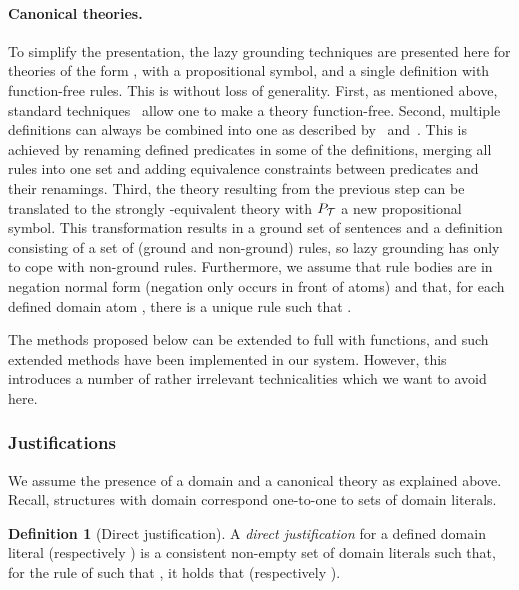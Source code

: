 \documentclass[11pt]{article}
\newcommand{\m}[1]{\ensuremath{#1}\xspace}
\newcommand{\theory}{\m{\mathcal{T}}}
\newcommand{\logicname}[1]{\text{\sc #1}\xspace}
\newcommand{\foid}{\logicname{FO(\ensuremath{ID})}}
\theoremstyle{plain}
\theoremstyle{definition}
\newtheorem{definition}[thm]{Definition}
\theoremstyle{example_basic}
\theoremstyle{example_contd}
\theoremstyle{plain}
\newcommand{\pt}{\ensuremath{P_\text{\theory}}\xspace}
\newcommand{\change}[1]{#1}
\begin{document}
\paragraph{Canonical theories.} To simplify the presentation, the lazy
grounding techniques are presented here for theories of the form
, with  a propositional symbol, and  a single
definition with function-free rules. This is without loss of
generality. First, as mentioned above, standard
techniques~\cite{Enderton01} allow one to make a theory function-free.
Second, multiple definitions can always be combined into one as
described by~ and~. \change{This is
 achieved by renaming defined predicates in some of the definitions,
 merging all rules into one set and adding equivalence constraints
 between predicates and their renamings.  Third, the  theory  resulting from the previous step can be translated to the  strongly -equivalent theory 
 with \pt a new propositional symbol. This transformation results in a ground set of sentences and a definition consisting of a set of (ground and non-ground) rules, so lazy grounding has only to cope with non-ground rules.
Furthermore, we assume that rule bodies are in negation normal form
(negation only occurs in front of atoms) and that, for each defined
domain atom , there is a unique rule  such that  .  }

The methods proposed below can be extended to full \foid with functions, and such
extended methods have been implemented in our system. However, this introduces a
number of rather irrelevant technicalities which we want to avoid
here.


\subsubsection{Justifications}\label{sec:justifications}

\newcommand{\jgraph}{\ensuremath{J}\xspace}
\newcommand{\justification}{{justification}\xspace}

\change{We assume the presence of a domain  and a canonical theory   as explained above. Recall, structures with domain  correspond one-to-one to sets of domain literals. }

\begin{definition}[Direct justification]
A \emph{direct justification} for a defined domain literal  (respectively ) is a consistent \change{non-empty} set  of domain literals such that, for the rule  of  such that , it holds that  (respectively ).
\end{definition}
\end{document}
